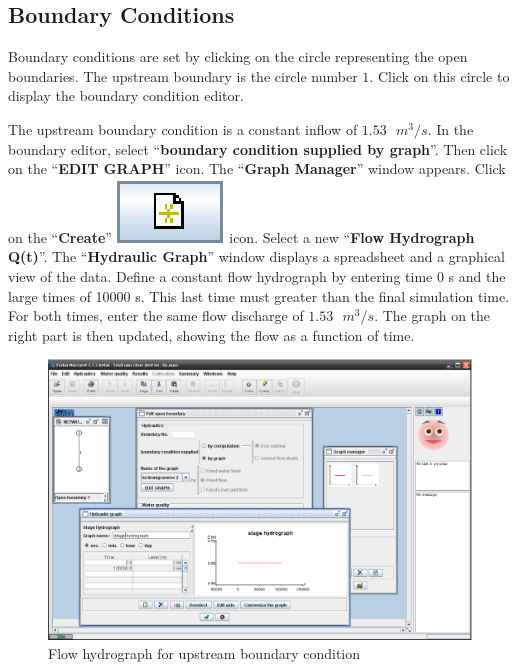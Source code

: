 \documentclass[a4paper,12pt]{article}
\begin{document}
\subsection{Boundary Conditions}

\hspace{0.5cm} Boundary conditions are set by clicking on the circle representing the open boundaries. The upstream boundary
is the circle number $1$. Click on this circle to display the boundary condition editor.

\vspace{0.5cm}

The upstream boundary condition is a constant inflow of $1.53\mbox{ }m^{3}/s$. In the boundary editor, select {}``\textbf{boundary condition supplied by
graph}''. Then click on the {}``\textbf{EDIT GRAPH}'' icon. The {}``\textbf{Graph Manager}'' window appears. Click on the {}``\textbf{Create}''
\includegraphics[scale=0.6]{new}
icon. Select a new {}``\textbf{Flow Hydrograph Q(t)}''. The {}``\textbf{Hydraulic
Graph}'' window displays a spreadsheet and a graphical view of the
data. Define a constant flow hydrograph by entering time 0 s and the large times of 10000 s. This last time must greater than the final simulation time.
For both times, enter the same flow discharge of $1.53\mbox{ }m^3/s$. The graph on the
right part is then updated, showing the flow as a function of time.

\begin{figure}[h]
  \begin{center}
  \includegraphics[scale=0.33]{stage_hydro}
  \caption{Flow hydrograph for upstream boundary condition}
  \end{center}
\end{figure}
\end{document}
